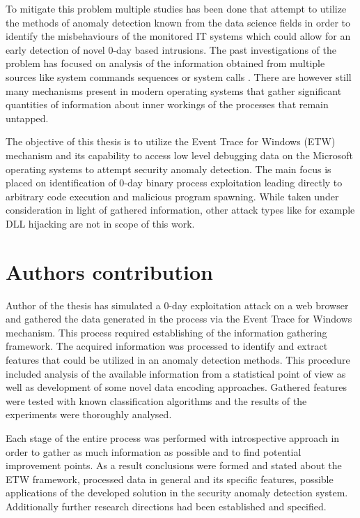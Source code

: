 \documentclass[a4paper,twoside,12pt]{book}
\begin{document}
To mitigate this problem multiple studies has been done that attempt to utilize the methods of
anomaly detection known from the data science fields in order to identify the misbehaviours of 
the monitored IT systems which could allow for an early detection of novel 0-day based intrusions.
The past investigations of the problem has focused on analysis of the information obtained from 
multiple sources like system commands sequences \cite{bib:lane1997application} or system calls 
\cite{bib:rsvm}. There are however still many mechanisms present in modern operating systems 
that gather significant quantities of information about inner workings of the processes that remain
untapped. 

The objective of this thesis is to utilize the Event Trace for Windows (ETW) mechanism and its 
capability to access low level debugging data on the Microsoft operating systems to attempt
security anomaly detection. The main focus is placed on identification of 0-day binary process 
exploitation leading directly to arbitrary code execution and malicious program spawning. While 
taken under consideration in light of gathered information, other attack types like for example 
DLL hijacking are not in scope of this work.

\section{Authors contribution}

Author of the thesis has simulated a 0-day exploitation attack on a web browser and gathered 
the data generated in the process via the Event Trace for Windows mechanism. This process 
required establishing of the information gathering framework. The acquired 
information was processed to identify and extract features that could be utilized in an anomaly detection
methods. This procedure included analysis of the available information from a statistical point of view
as well as development of some novel data encoding approaches. Gathered 
features were tested with known classification algorithms and the results of the experiments were thoroughly analysed.

Each stage of the entire process was performed with introspective approach in order to gather as much information 
as possible and to find potential improvement points. As a result conclusions were formed and stated about
the ETW framework, processed data in general and its specific features, possible applications of the developed
solution in the security anomaly detection system. Additionally further research directions had been established and specified.
\end{document}
